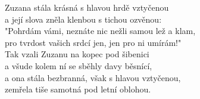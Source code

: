 \begin{large}
Zuzana stála krásná s hlavou hrdě vztyčenou\\
a její slova zněla klenbou s tichou ozvěnou:\\
"Pohrdám vámi, neznáte nic nežli samou lež a klam,\\
pro tvrdost vašich srdcí jen, jen pro ni umírám!"\\

Tak vzali Zuzanu na kopec pod šibenici\\
a všude kolem ní se sběhly davy běsnící,\\
a ona stála bezbranná, však s hlavou vztyčenou,\\
zemřela tiše samotná pod letní oblohou.

\end{large}

\newpage
